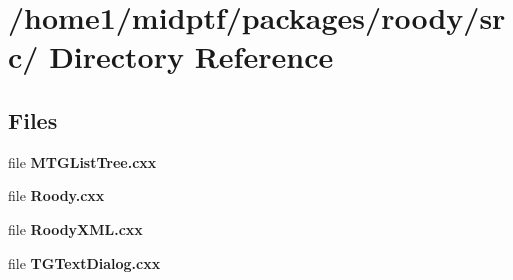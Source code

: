\section{/home1/midptf/packages/roody/src/ Directory Reference}
\label{dir_b3aa452d070ecf22c1e5f73c22d8afce}
\subsection*{Files}
\begin{DoxyCompactItemize}
\item 
file {\bf MTGListTree.cxx}
\item 
file {\bf Roody.cxx}
\item 
file {\bf RoodyXML.cxx}
\item 
file {\bf TGTextDialog.cxx}
\end{DoxyCompactItemize}
